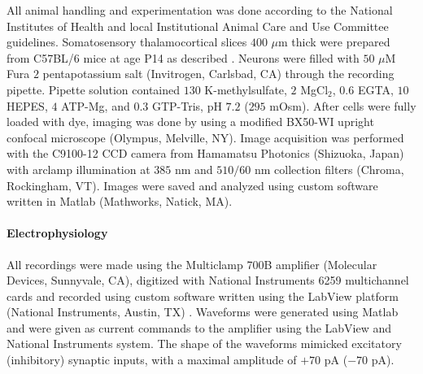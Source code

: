 All animal handling and experimentation was done according to the National Institutes of Health and local Institutional Animal Care and Use Committee guidelines. Somatosensory thalamocortical slices $400$ $\mu$m thick were prepared from C57BL/6 mice at age P14 as described \cite{MacLeanYuste05}. Neurons were filled with $50$ $\mu$M Fura $2$ pentapotassium salt (Invitrogen, Carlsbad, CA) through the recording pipette. Pipette solution contained $130$ K-methylsulfate, $2$ MgCl$_2$, $0.6$ EGTA, $10$ HEPES, $4$ ATP-Mg, and $0.3$ GTP-Tris, pH $7.2$ ($295$ mOsm).  After cells were fully loaded with dye, imaging was done by using a modified BX50-WI upright confocal microscope (Olympus, Melville, NY).  Image acquisition was performed with the C9100-12 CCD camera from Hamamatsu Photonics (Shizuoka, Japan) with arclamp illumination at $385$ nm and $510/60$ nm collection filters (Chroma, Rockingham, VT).  Images were saved and analyzed using custom software written in Matlab (Mathworks, Natick, MA).

\paragraph{Electrophysiology}

All recordings were made using the Multiclamp 700B amplifier (Molecular Devices, Sunnyvale, CA), digitized with National Instruments 6259 multichannel cards and recorded using custom software written using the LabView platform (National Instruments, Austin, TX) .  Waveforms were generated using Matlab and were given as current commands to the amplifier using the LabView and National Instruments system. The shape of the waveforms mimicked excitatory (inhibitory) synaptic inputs, with a maximal amplitude of $+70$ pA ($-70$ pA).